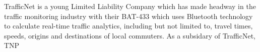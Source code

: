 TrafficNet is a young Limited Liability Company which has made headway in the traffic monitoring industry with their BAT-433 which uses Bluetooth technology to calculate real-time traffic analytics, including but not limited to, travel times, speeds, origins and destinations of local commuters. As a subsidary of TrafficNet, TNP  
